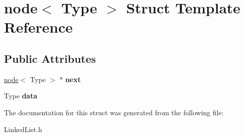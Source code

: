 \hypertarget{structnode}{}\section{node$<$ Type $>$ Struct Template Reference}
\label{structnode}
\subsection*{Public Attributes}
\begin{DoxyCompactItemize}
\item 
\mbox{\label{structnode_a89b6482e263bd001b885949460b85766}} 
\hyperlink{structnode}{node}$<$ Type $>$ $\ast$ {\bfseries next}
\item 
\mbox{\label{structnode_a83df696cde0652190a47af4c03b52f5e}} 
Type {\bfseries data}
\end{DoxyCompactItemize}


The documentation for this struct was generated from the following file\+:\begin{DoxyCompactItemize}
\item 
Linked\+List.\+h\end{DoxyCompactItemize}
